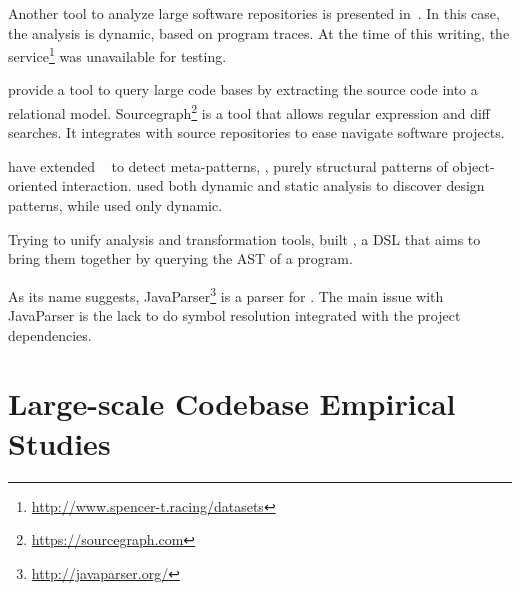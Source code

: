 Another tool to analyze large software repositories is presented in~\cite{brandauerSpencerInteractiveHeap2017}.
In this case, the analysis is dynamic, based on program traces. 
At the time of this writing, the service\footnote{\url{http://www.spencer-t.racing/datasets}} was unavailable for testing. 

\cite{bajracharyaSourcererInternetscaleSoftware2009} provide a tool to query large code bases by extracting the source code into a relational model.
Sourcegraph\footnote{\url{https://sourcegraph.com}} is a tool that allows regular expression and diff searches.
It integrates with source repositories to ease navigate software projects.


\cite{posnettTHEXMiningMetapatterns2010} have extended
\asm{}~\citep{brunetonASMCodeManipulation2002,kuleshovUsingASMFramework2007}
to detect meta-patterns, \ie,
purely structural patterns of object-oriented interaction.
\cite{huDynamicAnalysisDesign2008} used both dynamic and static analysis to discover design patterns, while \cite{arcelliDesignPatternDetection2008} used only dynamic.

Trying to unify analysis and transformation tools,
\cite{vinjuHowMakeBridge2006,klintRASCALDomainSpecific2009} built \rascal,
a DSL that aims to bring them together by querying the AST of a program.

As its name suggests, JavaParser\footnote{\url{http://javaparser.org/}}
is a parser for \java.
The main issue with JavaParser is the lack to do symbol resolution integrated with the project dependencies.


\section{Large-scale Codebase Empirical Studies}
\label{sec:lr:largescale}

